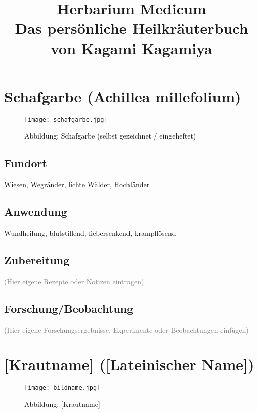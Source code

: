 \documentclass[12pt,a4paper]{article}
\title{\Huge\bfseries Herbarium Medicum\\[0.2cm]\large Das persönliche Heilkräuterbuch von Kagami Kagamiya}
\author{}
\date{}
\begin{document}
\maketitle
\thispagestyle{empty}
\newpage

\tableofcontents
\newpage

\section{Schafgarbe (Achillea millefolium)}

\begin{figure}[h!]
    \centering
    \texttt{[image: schafgarbe.jpg]}
    \caption*{Abbildung: Schafgarbe (selbst gezeichnet / eingeheftet)}
\end{figure}

\subsection*{Fundort}
Wiesen, Wegränder, lichte Wälder, Hochländer

\subsection*{Anwendung}
Wundheilung, blutstillend, fiebersenkend, krampflösend

\subsection*{Zubereitung}
\textcolor{gray}{(Hier eigene Rezepte oder Notizen eintragen)}

\subsection*{Forschung/Beobachtung}
\textcolor{gray}{(Hier eigene Forschungsergebnisse, Experimente oder Beobachtungen einfügen)}

\newpage

\section{[Krautname] ([Lateinischer Name])}

\begin{figure}[h!]
    \centering
    \texttt{[image: bildname.jpg]}
    \caption*{Abbildung: [Krautname]}
\end{figure}
\end{document}
